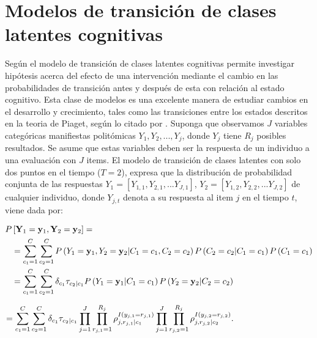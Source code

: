 
\chapter{Modelos de transici\'{o}n de clases latentes cognitivas} \label{cap:modelo}
	Seg\'{u}n \cite{kaya2017assessing} el modelo de transici\'{o}n de clases latentes cognitivas permite investigar hip\'{o}tesis acerca del efecto de una intervenci\'{o}n mediante el cambio en las probabilidades de transici\'{o}n antes y despu\'{e}s de esta con relaci\'{o}n al estado cognitivo. Esta clase de modelos es una excelente manera de estudiar cambios en el desarrollo y crecimiento, tales como las transiciones entre los estados descritos en la teoria de Piaget, seg\'{u}n lo citado por \cite{li2016latent}.
	Suponga que observamos $J$ variables categ\'{o}ricas manifiestas polit\'{o}micas $Y_1, Y_2, ..., Y_j$, donde $Y_j$ tiene $R_j$ posibles resultados. Se asume que estas variables deben ser la respuesta de un individuo a una evaluaci\'{o}n con $J$ items. El modelo de transici\'{o}n de clases latentes con solo dos puntos en el tiempo ($T=2$), expresa que la distribuci\'{o}n de probabilidad conjunta de las respuestas $Y_{1} = [Y_{1,1},Y_{2,1}, ... Y_{J,1}]$, $Y_{2} = [Y_{1,2},Y_{2,2}, ... Y_{J,2}]$  de cualquier individuo, donde $Y_{j,t}$ denota a su respuesta al item $j$ en el tiempo $t$, viene dada por:

	\begin{align}
		P&\left[\mathbf{Y}_{1} =  \mathbf{y}_{1}, \mathbf{Y}_{2} =\mathbf{y}_{2}\right]  =  \notag \\
		& = \sum _{ { c }_{ 1 }=1 }^{ C }{ \sum _{ { c }_{ 2 }=1 }^{ C }{ P\left( { Y }_{ 1 }=\mathbf{ y }_{ 1 },{ Y }_{ 2 }=\mathbf{ y }_{ 2 }|{ C }_{ 1 }={ c }_{ 1 },{ C }_{ 2 }={ c }_{ 2 } \right) P\left( { C }_{ 2 }={ c }_{ 2 }|{ C }_{ 1 }={ c }_{ 1 } \right) P\left( { C }_{ 1 }={ c }_{ 1 } \right)  }  } \label{3.1} \\
		& =\sum _{ { c }_{ 1 }=1 }^{ C } \sum _{ { c }_{ 2 }=1 }^{ C }{ { \delta  }_{ { c }_{ 1 } }{ \tau  }_{ { c }_{ 2 }|{ c }_{ 1 } }P\left( { Y }_{ 1 }=\mathbf{y}_{1}|{ C }_{ 1 }={ c }_{ 1 } \right) P\left( { Y }_{ 2 }=\mathbf{y}_{2}|{ C }_{ 2 }={ c }_{ 2 } \right)} \\
		\end{align}
		
	\begin{equation}
	=\sum _{ { c }_{ 1 }=1 }^{ C } \sum _{ { c }_{ 2 }=1 }^{ C }{ { \delta  }_{ { c }_{ 1 } }{ \tau  }_{ { c }_{ 2 }|{ c }_{ 1 } }\prod _{ j=1 }^{ J }{ \prod _{ { r }_{ j,1 }=1 }^{ { R }_{ j } }{ { \rho  }_{ j,{ r }_{ j,1 }|{ c }_{ 1 } }^{ I\left( { y }_{ j,1 }={ r }_{ j,1 } \right)  } }  }  } \prod _{ j=1 }^{ J }{ \prod _{ { r }_{ j,2 }=1 }^{ { R }_{ j } }{ \rho _{ j,{ r }_{ j,2 }|{ c }_{ 2 } }^{ I\left( { y }_{ j,2 }={ r }_{ j,2 } \right)  } }  } . \hspace{3.2cm}\label{3.1}
	\end{equation}
	
